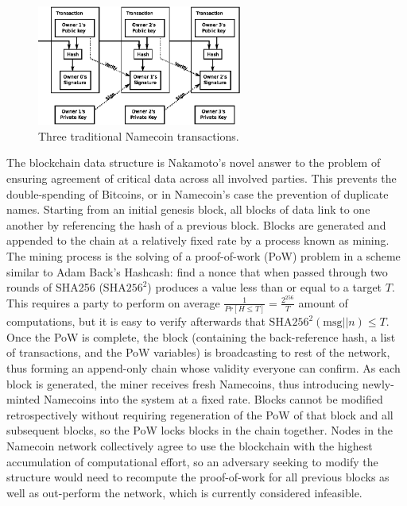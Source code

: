 \begin{figure}[htbp]
	\centering
	\includegraphics[width=0.6\textwidth]{images/Namecoin/bitcoin_transaction.eps}
	\caption{Three traditional Namecoin transactions.}
	\label{fig:figure7}
\end{figure}

The blockchain data structure is Nakamoto's novel answer to the problem of ensuring agreement of critical data across all involved parties. This prevents the double-spending of Bitcoins, or in Namecoin's case the prevention of duplicate names. Starting from an initial genesis block, all blocks of data link to one another by referencing the hash of a previous block. Blocks are generated and appended to the chain at a relatively fixed rate by a process known as mining. The mining process is the solving of a proof-of-work (PoW) problem in a scheme similar to Adam Back's Hashcash: find a nonce that when passed through two rounds of SHA256 ($ \textrm{SHA}256^{{2}} $) produces a value less than or equal to a target $ T $. This requires a party to perform on average $ \frac{1}{Pr[H \leq T]} = \frac{2 ^ {{256}}}{T} $ amount of computations, but it is easy to verify afterwards that $ \textrm{SHA}256^{{2}}(\textrm{msg} || n) \leq T $. Once the PoW is complete, the block (containing the back-reference hash, a list of transactions, and the PoW variables) is broadcasting to rest of the network, thus forming an append-only chain whose validity everyone can confirm. As each block is generated, the miner receives fresh Namecoins, thus introducing newly-minted Namecoins into the system at a fixed rate. Blocks cannot be modified retrospectively without requiring regeneration of the PoW of that block and all subsequent blocks, so the PoW locks blocks in the chain together. Nodes in the Namecoin network collectively agree to use the blockchain with the highest accumulation of computational effort, so an adversary seeking to modify the structure would need to recompute the proof-of-work for all previous blocks as well as out-perform the network, which is currently considered infeasible.\cite{Okupski2014}

